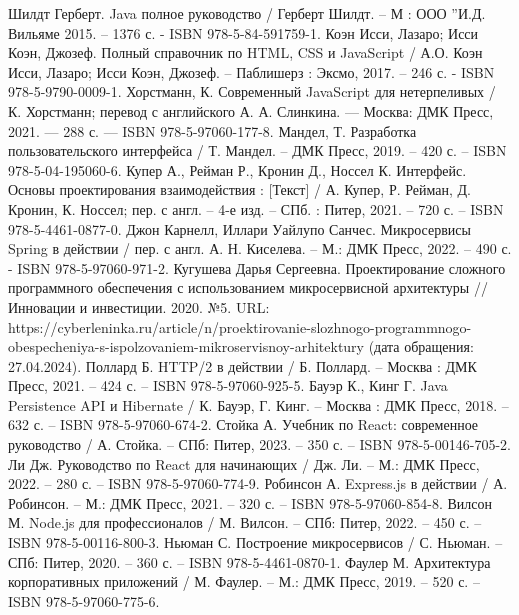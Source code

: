 
\begin{thebibliography}{9}

     Шилдт Герберт. Java полное руководство / Герберт Шилдт. – М : ООО ”И.Д. Вильяме 2015. – 1376 с. - ISBN 978-5-84-591759-1.
     Коэн Исси, Лазаро; Исси Коэн, Джозеф. Полный справочник по HTML, CSS и JavaScript / А.О. Коэн Исси, Лазаро; Исси Коэн, Джозеф. – Паблишерз : Эксмо, 2017. – 246 с. - ISBN 978-5-9790-0009-1.
     Хорстманн, К. Современный JavaScript для нетерпеливых / К. Хорстманн; перевод с английского А. А. Слинкина. — Москва: ДМК Пресс, 2021. — 288 с. — ISBN 978-5-97060-177-8.
    	Мандел, Т. Разработка пользовательского интерфейса / Т. Мандел. – ДМК Пресс, 2019. – 420 с. – ISBN 978-5-04-195060-6.
		Купер А., Рейман Р., Кронин Д., Носсел К. Интерфейс. Основы проектирования взаимодействия : [Текст] / А. Купер, Р. Рейман, Д. Кронин, К. Носсел; пер. с англ. – 4-е изд. – СПб. : Питер, 2021. – 720 с. – ISBN 978-5-4461-0877-0.
		Джон Карнелл, Иллари Уайлупо Санчес. Микросервисы Spring в действии / пер. с англ. А. Н. Киселева. – М.: ДМК Пресс, 2022. – 490 с. - ISBN 978-5-97060-971-2.
	 Кугушева Дарья Сергеевна. Проектирование сложного программного обеспечения с использованием микросервисной архитектуры // Инновации и инвестиции. 2020. №5. URL: https://cyberleninka.ru/article/n/proektirovanie-slozhnogo-programmnogo-obespecheniya-s-ispolzovaniem-mikroservisnoy-arhitektury (дата обращения: 27.04.2024).
	 Поллард Б. HTTP/2 в действии / Б. Поллард. – Москва : ДМК Пресс, 2021. – 424 с. – ISBN 978-5-97060-925-5.
		Бауэр К., Кинг Г. Java Persistence API и Hibernate / К. Бауэр, Г. Кинг. – Москва : ДМК Пресс, 2018. – 632 с. – ISBN 978-5-97060-674-2.   
	 Стойка А. Учебник по React: современное руководство / А. Стойка. – СПб: Питер, 2023. – 350 с. – ISBN 978-5-00146-705-2.    
	 Ли Дж. Руководство по React для начинающих / Дж. Ли. – М.: ДМК Пресс, 2022. – 280 с. – ISBN 978-5-97060-774-9.    
	 Робинсон А. Express.js в действии / А. Робинсон. – М.: ДМК Пресс, 2021. – 320 с. – ISBN 978-5-97060-854-8.    
	 Вилсон М. Node.js для профессионалов / М. Вилсон. – СПб: Питер, 2022. – 450 с. – ISBN 978-5-00116-800-3.
	 Ньюман С. Построение микросервисов / С. Ньюман. – СПб: Питер, 2020. – 360 с. – ISBN 978-5-4461-0870-1.
	 Фаулер М. Архитектура корпоративных приложений / М. Фаулер. – М.: ДМК Пресс, 2019. – 520 с. – ISBN 978-5-97060-775-6.

\end{thebibliography}
